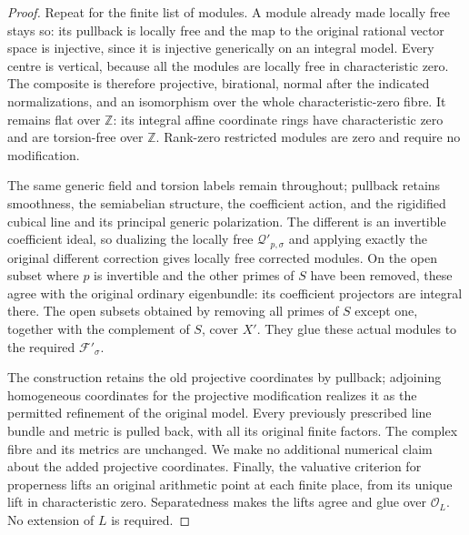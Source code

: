 \begin{proof}
Repeat for the finite list of modules. A module already made
locally free stays so: its pullback is locally free and the map
to the original rational vector space is injective, since it is
injective generically on an integral model. Every centre is
vertical, because all the modules are locally free in
characteristic zero. The composite is therefore projective,
birational, normal after the indicated normalizations, and an
isomorphism over the whole characteristic-zero fibre. It remains
flat over $\mathbb Z$: its integral affine coordinate rings have
characteristic zero and are torsion-free over $\mathbb Z$.
Rank-zero
restricted modules are zero and require no modification.

The same generic field and torsion labels remain throughout;
pullback retains smoothness, the semiabelian structure, the
coefficient action, and the rigidified cubical line and its
principal generic polarization. The different is an invertible
coefficient ideal, so dualizing the locally free
$\mathcal Q'_{p,\sigma}$ and applying exactly the original
different correction gives locally free corrected modules.
On the open subset where $p$ is invertible and the other primes
of $S$ have been removed, these agree with the original ordinary
eigenbundle: its coefficient projectors are integral there.
The open subsets obtained by removing all primes of $S$ except
one, together with the complement of $S$, cover $X'$. They glue
these actual modules to the required $\mathcal F'_{\sigma}$.

The construction retains the old projective coordinates by
pullback; adjoining homogeneous coordinates for the projective
modification realizes it as the permitted refinement of the
original model. Every previously prescribed line bundle and
metric is pulled back, with all its original finite factors.
The complex fibre and its metrics are unchanged. We make no
additional numerical claim about the added projective
coordinates. Finally, the valuative criterion for properness
lifts an original arithmetic point at each finite place, from
its unique lift in characteristic zero. Separatedness makes the
lifts agree and glue over $\mathcal O_L$. No extension of $L$
is required.
\end{proof}
